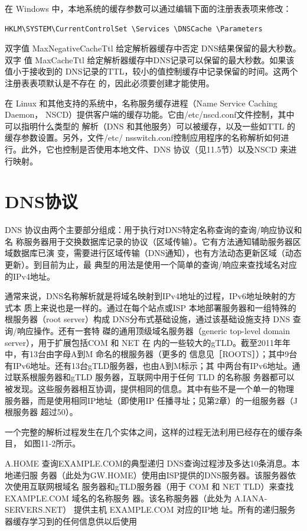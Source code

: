 在 Windows 中，本地系统的缓存参数可以通过编辑下面的注册表表项来修改：

\begin{verbatim}
HKLM\SYSTEM\CurrentControlSet \Services \DNSCache \Parameters
\end{verbatim}

双字值 MaxNegativeCacheTtl 给定解析器缓存中否定 DNS结果保留的最大秒数。双字
值 MaxCacheTtl 给定解析器缓存中DNS记录可以保留的最大秒数。如果该值小于接收到的
DNS记录的TTL，较小的值控制缓存中记录保留的时间。这两个注册表表项默认是不存在
的，因此必须要创建才能使用。

在 Linux 和其他支持的系统中，名称服务缓存进程（Name Service Caching Daemon，
NSCD）提供客户端的缓存功能。它由/etc/nscd.conf文件控制，其中可以指明什么类型的
解析（DNS 和其他服务）可以被缓存，以及一些如TTL 的缓存参数设置。另外，文件/etc/
nsswitch.conf控制应用程序的名称解析如何进行。此外，它也控制是否使用本地文件、DNS
协议（见11.5节）以及NSCD 来进行映射。

\section{DNS协议}

DNS 协议由两个主要部分组成：用于执行对DNS特定名称查询的查询/响应协议和名
称服务器用于交换数据库记录的协议（区域传输）。它有方法通知辅助服务器区域数据库已演
变，需要进行区域传输（DNS通知），也有方法动态更新区域（动态更新）。到目前为止，最
典型的用法是使用一个简单的查询/响应来查找域名对应的IPv4地址。

通常来说，DNS名称解析就是将域名映射到IPv4地址的过程，IPv6地址映射的方式本
质上来说也是一样的。通过在每个站点或ISP 本地部署服务器和一组特殊的根服务器（root
server）构成 DNS分布式基础设施，通过该基础设施支持 DNS 查询/响应操作。还有一套特
磔的通用顶级域名服务器（generic top-level domain server），用于扩展包括COM 和 NET 在
内的一些较大的gTLD。截至2011年年中，有13台由字母A到M 命名的根服务器（更多的
信息见［ROOTS］）；其中9台有IPv6地址。还有13台gTLD服务器，也由A到M标示；其
中两台有IPv6地址。通过联系根服务器和gTLD 服务器，互联网中用于任何 TLD 的名称服
务器都可以被发现。这些服务器相互协调，提供相同的信息。其中有些不是一个单一的物理
服务器，而是使用相同IP地址（即使用IP 任播寻址；见第2章）的一组服务器（J根服务器
超过50）。

一个完整的解析过程发生在几个实体之间，这样的过程无法利用已经存在的缓存条目，
如图11-2所示。

A.HOME 查询EXAMPLE.COM的典型递归 DNS查询过程涉及多达10条消息。本地递归服
务器（此处为GW.HOME）使用由ISP提供的DNS服务器。该服务器依次使用互联网根域名
服务器和gTLD服务器（用于 COM 和 NET TLD）来查找EXAMPLE.COM 域名的名称服务
器。该名称服务器（此处为 A.IANA-SERVERS.NET） 提供主机 EXAMPLE.COM 对应的IP地
址。所有的递归服务器缓存学习到的任何信息供以后使用

